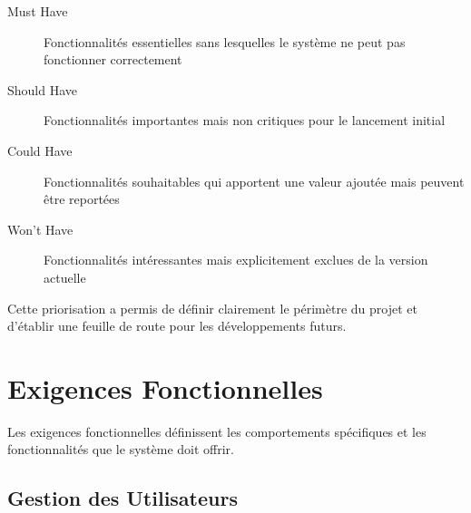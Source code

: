 \begin{description}
    \item[Must Have] Fonctionnalités essentielles sans lesquelles le système ne peut pas fonctionner correctement
    \item[Should Have] Fonctionnalités importantes mais non critiques pour le lancement initial
    \item[Could Have] Fonctionnalités souhaitables qui apportent une valeur ajoutée mais peuvent être reportées
    \item[Won't Have] Fonctionnalités intéressantes mais explicitement exclues de la version actuelle
\end{description}

Cette priorisation a permis de définir clairement le périmètre du projet et d'établir une feuille de route pour les développements futurs.

\section{Exigences Fonctionnelles}

Les exigences fonctionnelles définissent les comportements spécifiques et les fonctionnalités que le système doit offrir.

\subsection{Gestion des Utilisateurs}

